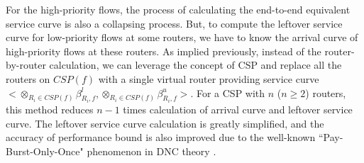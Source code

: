 \documentclass[10pt,journal]{IEEEtran}
\begin{document}
For the high-priority flows, the process of calculating the end-to-end equivalent service curve is also a collapsing process. But, to compute the leftover service curve for low-priority flows at some routers, we have to know the arrival curve of high-priority flows at these routers. As implied previously, instead of the router-by-router calculation, we can leverage the concept of CSP and replace all the routers on $CSP(f)$ with a single virtual router providing service curve $<\otimes_{R_i\in CSP(f)}\beta_{R_i,f}^l,\otimes_{R_i\in CSP(f)}\beta_{R_i,f}^u>$. For a CSP with $n$ ($n\geq 2$) routers, this method reduces $n-1$ times calculation of arrival curve and leftover service curve. The leftover service curve calculation is greatly simplified, and the accuracy of performance bound is also improved due to the well-known ``Pay-Burst-Only-Once" phenomenon in DNC theory \cite{Boudec2001Network}.
\end{document}
